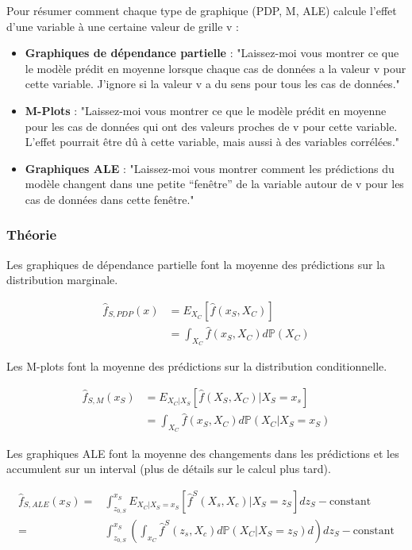 Pour résumer comment chaque type de graphique (PDP, M, ALE) calcule l'effet d'une variable à une certaine valeur de grille v : 

\begin{itemize}
    \item \textbf{Graphiques de dépendance partielle} : "Laissez-moi vous montrer ce que le modèle prédit en moyenne lorsque chaque cas de données a la valeur v pour cette variable. J'ignore si la valeur v a du sens pour tous les cas de données."
    \item \textbf{M-Plots} : "Laissez-moi vous montrer ce que le modèle prédit en moyenne pour les cas de données qui ont des valeurs proches de v pour cette variable. L'effet pourrait être dû à cette variable, mais aussi à des variables corrélées."
    \item \textbf{Graphiques ALE} : "Laissez-moi vous montrer comment les prédictions du modèle changent dans une petite ``fenêtre'' de la variable autour de v pour les cas de données dans cette fenêtre."
\end{itemize}



\subsubsection{Théorie}

Les graphiques de dépendance partielle font la moyenne des prédictions sur la distribution marginale.

\begin{align*}
\hat{f}_{S,PDP}(x)&=E_{X_C}\left[\hat{f}(x_S,X_C)\right] \\
& = \int_{X_C}\hat{f}(x_S,X_C)d\mathbb{P}(X_C)
\end{align*}

Les M-plots font la moyenne des prédictions sur la distribution conditionnelle.

\begin{align*}\hat{f}_{S,M}(x_S)&=E_{X_C|X_S}\left[\hat{f}(X_S,X_C)|X_S=x_s\right]\\&=\int_{X_C}\hat{f}(x_S, X_C)d\mathbb{P}(X_C|X_S = x_S)\end{align*}

Les graphiques ALE font la moyenne des changements dans les prédictions et les accumulent sur un interval (plus de détails sur le calcul plus tard).

\begin{align*}
\hat{f}_{S,ALE}(x_S)=&\int_{z_{0,S}}^{x_S}E_{X_C|X_S = x_S}\left[\hat{f}^S(X_s,X_c)|X_S=z_S\right]dz_S-\text{constant}\\
 = & \int_{z_{0,S}}^{x_S}(\int_{x_C}\hat{f}^S(z_s,X_c)d\mathbb{P}(X_C|X_S = z_S)d{})dz_S-\text{constant}
\end{align*}

